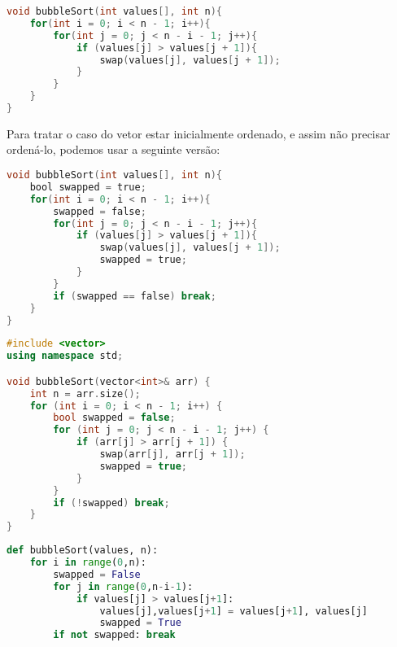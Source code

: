 \begin{lstlisting}[language=C,caption={Bubble sort em C},captionpos=t]
void bubbleSort(int values[], int n){
    for(int i = 0; i < n - 1; i++){
        for(int j = 0; j < n - i - 1; j++){
            if (values[j] > values[j + 1]){
                swap(values[j], values[j + 1]);
            }
        }
    }
}
\end{lstlisting}

Para tratar o caso do vetor estar inicialmente ordenado, e assim não precisar ordená-lo, podemos usar a seguinte versão: 
\begin{lstlisting}[language=C,caption={Bubble sort otimizado em C},captionpos=t]
void bubbleSort(int values[], int n){
    bool swapped = true;
    for(int i = 0; i < n - 1; i++){
        swapped = false;
        for(int j = 0; j < n - i - 1; j++){
            if (values[j] > values[j + 1]){
                swap(values[j], values[j + 1]);
                swapped = true;
            }
        }
        if (swapped == false) break;
    }
}
\end{lstlisting}

\begin{lstlisting}[language=C++,caption={Bubble sort em C++},captionpos=t]
#include <vector>
using namespace std;

void bubbleSort(vector<int>& arr) {
    int n = arr.size();
    for (int i = 0; i < n - 1; i++) {
        bool swapped = false;
        for (int j = 0; j < n - i - 1; j++) {
            if (arr[j] > arr[j + 1]) {
                swap(arr[j], arr[j + 1]);
                swapped = true;
            }
        }
        if (!swapped) break;
    }
}
\end{lstlisting}

\begin{lstlisting}[language=Python,caption={Bubble sort otimizado em Python},captionpos=t]
def bubbleSort(values, n):
    for i in range(0,n):
        swapped = False  
        for j in range(0,n-i-1):
            if values[j] > values[j+1]:
                values[j],values[j+1] = values[j+1], values[j]
                swapped = True
        if not swapped: break
\end{lstlisting}


